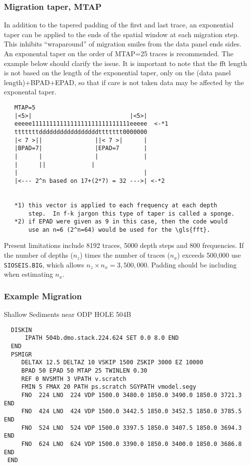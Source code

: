 \subsubsection{Migration taper, MTAP}
   In addition to the tapered padding of the first and last trace, an
   exponential taper can be applied to the ends of the spatial window
   at each migration step.  This inhibits ``wraparound'' of migration
   smiles from the data panel ends sides.  An exponental taper on the
   order of MTAP=25 traces is recommended.  The example below should
   clarify the issue.  It is important to note that the \gls{fft} length is
   not based on the length of the exponential taper, only on the
   (data panel length)+BPAD+EPAD, so that if care is not taken data
   may be affected by the exponental taper.

\begin{verbatim}
   MTAP=5
   |<5>|                            |<5>|
   eeeee1111111111111111111111111111eeeee  <-*1
   tttttttdddddddddddddddddttttttt0000000
   |< 7 >||               ||< 7 >|      |
   |BPAD=7|               |EPAD=7       |
   |      |               |             |
   |      ||             |
   |                                    |
   |<--- 2^n based on 17+(2*7) = 32 --->| <-*2


   *1) this vector is applied to each frequency at each depth
       step.  In f-k jargon this type of taper is called a sponge.
   *2) if EPAD were given as 9 in this case, then the code would
       use an n=6 (2^n=64) would be used for the \gls{fft}.
\end{verbatim}


Present limitations include 8192 traces, 5000 depth steps and 800
frequencies.  If the number of depths ($n_{z}$) times the number of traces
($n_{x}$) exceeds 500,000 use \texttt{SIOSEIS.BIG}, which allows $n_{z} \times n_{x} = 3,500,000$.
Padding should be including when estimating $n_{x}$.


\subsubsection{Example Migration}
  Shallow Sediments near ODP HOLE 504B
\begin{verbatim}
  DISKIN
      IPATH 504b.dmo.stack.224.624 SET 0.0 8.0 END
  END
  PSMIGR
     DELTAX 12.5 DELTAZ 10 VSKIP 1500 ZSKIP 3000 EZ 10000
     BPAD 50 EPAD 50 MTAP 25 TWINLEN 0.30
     REF 0 NVSMTH 3 VPATH v.scratch
     FMIN 5 FMAX 20 PATH ps.scratch SGYPATH vmodel.segy
     FNO  224 LNO  224 VDP 1500.0 3480.0 1850.0 3490.0 1850.0 3721.3 END
     FNO  424 LNO  424 VDP 1500.0 3442.5 1850.0 3452.5 1850.0 3785.5 END
     FNO  524 LNO  524 VDP 1500.0 3397.5 1850.0 3407.5 1850.0 3694.3 END
     FNO  624 LNO  624 VDP 1500.0 3390.0 1850.0 3400.0 1850.0 3686.8 END
 END
\end{verbatim}

